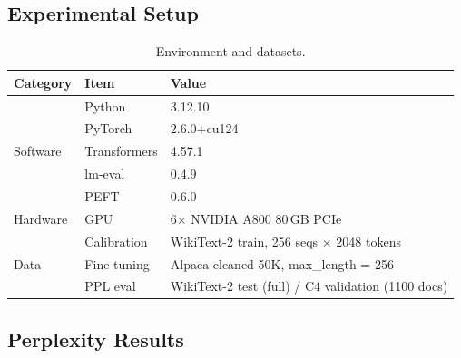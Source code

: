 \documentclass[11pt,a4paper]{article}
\theoremstyle{remark}
\begin{document}
\subsection{Experimental Setup}

\begin{table}[H]
\centering
\caption{Environment and datasets.}
\small
\begin{tabular}{@{}lll@{}}
\toprule
\textbf{Category} & \textbf{Item} & \textbf{Value} \\
\midrule
\multirow{5}{*}{Software}
  & Python      & 3.12.10 \\
  & PyTorch     & 2.6.0+cu124 \\
  & Transformers & 4.57.1 \\
  & lm-eval     & 0.4.9 \\
  & PEFT        & 0.6.0 \\
\midrule
Hardware & GPU & 6$\times$ NVIDIA A800 80\,GB PCIe \\
\midrule
\multirow{3}{*}{Data}
  & Calibration & WikiText-2 train, 256 seqs $\times$ 2048 tokens \\
  & Fine-tuning & Alpaca-cleaned 50K, max\_length = 256 \\
  & PPL eval    & WikiText-2 test (full) / C4 validation (1100 docs) \\
\bottomrule
\end{tabular}
\end{table}

\subsection{Perplexity Results}
\end{document}
